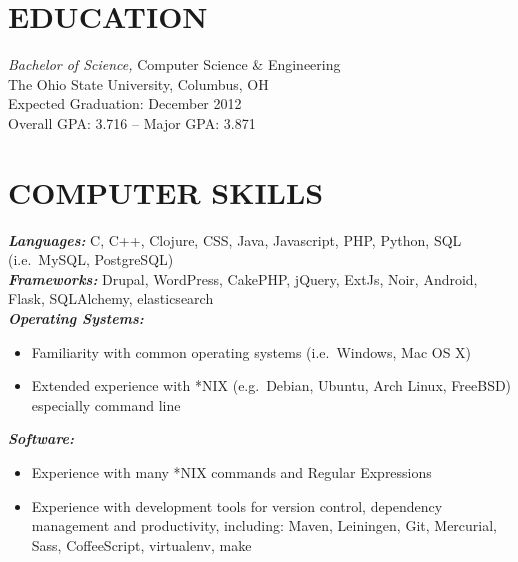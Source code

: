 \documentclass[line,letterpaper]{resume}
\begin{document}
\address{2092 Middlesex road, Columbus, OH 43220}
\address{\href{mailto:ryan@ryanmcg.com}{ryan@ryanmcg.com} -- (614) 678-4408 --
\href{https://github.com/RyanMcG}{RyanMcG on GitHub}}


\begin{resume}
    \vspace{-24pt}
    \section{\uppercase{Education}} {\sl Bachelor of Science,} \/
    Computer Science \& Engineering \\
    The Ohio State University, Columbus, OH \\
    Expected Graduation: December 2012 \\
    Overall GPA: 3.716 -- Major GPA: 3.871 \\

    \vspace{-16pt}

    \section{\uppercase{Computer Skills}}
    {\sl\textbf{Languages:}}
    \/C, C++, Clojure, CSS, Java, Javascript, PHP, Python, SQL
    (i.e.~MySQL, PostgreSQL) \\
    {\sl\textbf{Frameworks:}} 
    \/Drupal, WordPress, CakePHP, jQuery, ExtJs, Noir, Android, Flask,
    SQLAlchemy, elasticsearch \\
    {\sl\textbf{Operating Systems: }} \hfill 
    \begin{itemize}
        \item Familiarity with common operating systems (i.e.~Windows, Mac OS X)
        \item Extended experience with *NIX (e.g.~Debian, Ubuntu, Arch Linux,
            FreeBSD) especially command line
    \end{itemize}
    \vspace{-10pt}
    {\sl\textbf{Software:}} \hfill 
    \begin{itemize}
        \item Experience with many *NIX commands and Regular Expressions
        \item Experience with development tools for version control, dependency
            management and productivity, including: Maven, Leiningen, Git,
            Mercurial, Sass, CoffeeScript, virtualenv, make
    \end{itemize}


\end{resume}
\end{document}
